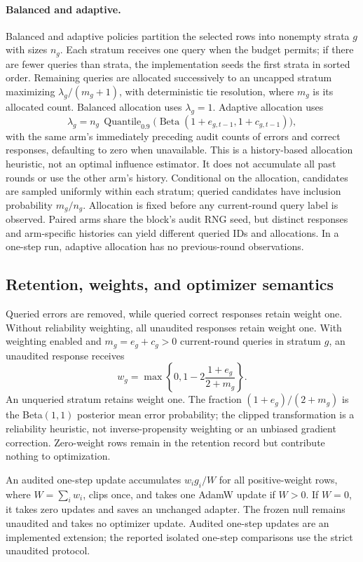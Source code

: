 \paragraph{Balanced and adaptive.}
Balanced and adaptive policies partition the selected rows into nonempty
strata $g$ with sizes $n_g$. Each stratum receives one query when the budget permits; if there are fewer
queries than strata, the implementation seeds the first strata in sorted
order. Remaining queries are allocated successively to an uncapped stratum
maximizing $\lambda_g/(m_g+1)$, with deterministic tie resolution, where
$m_g$ is its allocated count. Balanced allocation uses $\lambda_g=1$.
Adaptive allocation uses
\[
 \lambda_g=n_g\,
 \operatorname{Quantile}_{0.9}
 \bigl(\operatorname{Beta}(1+e_{g,t-1},1+c_{g,t-1})\bigr),
\]
with the same arm's immediately preceding audit counts of errors and
correct responses, defaulting to zero when unavailable. This is a
history-based allocation heuristic, not an optimal influence estimator.
It does not accumulate all past rounds or use the other arm's history.
Conditional on the allocation, candidates are sampled uniformly within each stratum;
queried candidates have inclusion probability $m_g/n_g$.
Allocation is fixed before any current-round query label is observed.
Paired arms share the block's audit RNG seed, but distinct responses and
arm-specific histories can yield different queried IDs and allocations.
In a one-step run, adaptive allocation has no previous-round observations.

\subsection{Retention, weights, and optimizer semantics}

Queried errors are removed, while queried correct responses retain weight one.
Without reliability weighting, all unaudited responses retain weight one.
With weighting enabled and $m_g=e_g+c_g>0$ current-round queries in stratum
$g$, an unaudited response receives
\[
 w_g=\max\left\{0,1-2\frac{1+e_g}{2+m_g}\right\}.
\]
An unqueried stratum retains weight one. The fraction
$(1+e_g)/(2+m_g)$ is the Beta$(1,1)$ posterior mean error probability;
the clipped transformation is a reliability heuristic, not inverse-propensity
weighting or an unbiased gradient correction. Zero-weight rows remain in
the retention record but contribute nothing to optimization.

An audited one-step update accumulates $w_i g_i/W$ for all positive-weight rows,
where $W=\sum_iw_i$, clips once, and takes one AdamW update if $W>0$.
If $W=0$, it takes zero updates and saves an unchanged adapter. The frozen
null remains unaudited and takes no optimizer update.
Audited one-step updates are an implemented extension; the reported
isolated one-step comparisons use the strict unaudited protocol.


